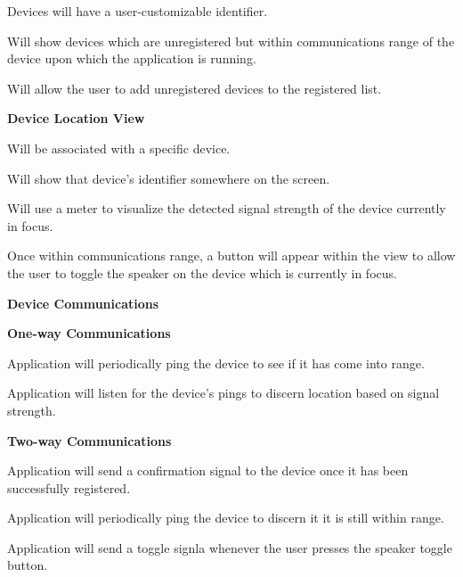 \documentclass[12pt]{article}
\begin{document}
\begin{packed_enum}
\begin{packed_enum}
\begin{packed_enum}
\begin{packed_enum}
		  				\item Devices will have a user-customizable identifier.
		  				\item Will show devices which are unregistered but within communications range of the device upon which the application is running.
		  				\item Will allow the user to add unregistered devices to the registered list. 
		  				\end{packed_enum}
		  			\item \textbf{Device Location View} 
		  			\begin{packed_enum}
						\item Will be associated with a specific device.
						\item Will show that device's identifier somewhere on the screen.
						\item Will use a meter to visualize the detected signal strength of the device currently in focus.
						\item Once within communications range, a button will appear within the view to allow the user to toggle the speaker on the device which is currently in focus.
		  				\end{packed_enum}
		  		\end{packed_enum}
		  		\item \textbf{Device Communications}
		  		\begin{packed_enum}
		  			\item \textbf{One-way Communications}
		  			\begin{packed_enum}
		  				\item Application will periodically ping the device to see if it has come into range.
		  				\item Application will listen for the device's pings to discern location based on signal strength.
		  				\end{packed_enum}
		  			\item \textbf{Two-way Communications}
		  			\begin{packed_enum}
		  				\item Application will send a confirmation signal to the device once it has been successfully registered.
		  				\item Application will periodically ping the device to discern it it is still within range.
		  				\item Application will send a toggle signla whenever the user presses the speaker toggle button.
		  				\end{packed_enum}

\end{packed_enum}
\end{packed_enum}
\end{packed_enum}
\end{document}
